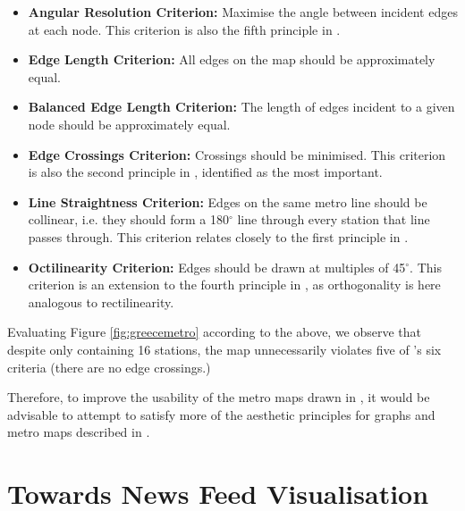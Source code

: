 \begin{itemize}
	\item \textbf{Angular Resolution Criterion:} Maximise the angle between incident edges at each node. This criterion is also the fifth principle in \citep{TheBasisForGraphDrawingAlgorithms}. 
	\item \textbf{Edge Length Criterion:} All edges on the map should be approximately equal.
	\item \textbf{Balanced Edge Length Criterion:} The length of edges incident to a given node should be approximately equal.
	\item \textbf{Edge Crossings Criterion:} Crossings should be minimised. This criterion is also the second principle in \citep{TheBasisForGraphDrawingAlgorithms}, identified as the most important.
	\item \textbf{Line Straightness Criterion:} Edges on the same metro line should be collinear, i.e. they should form a 180$^{\circ}$ line through every station that line passes through. This criterion relates closely to the first principle in \citep{TheBasisForGraphDrawingAlgorithms}.
	\item \textbf{Octilinearity Criterion:} Edges should be drawn at multiples of 45$^{\circ}$. This criterion is an extension to the fourth principle in \citep{TheBasisForGraphDrawingAlgorithms}, as orthogonality is here analogous to rectilinearity.
\end{itemize}

Evaluating Figure \ref{fig:greecemetro} according to the above, we observe that despite only containing 16 stations, the map unnecessarily violates five  of \citeauthor{AutomaticMetroMapLayout}'s six criteria (there are no edge crossings.)

Therefore, to improve the usability of the metro maps drawn in \citep{ConnectingTheDots, GeneratingInformationMaps, MetroMapsOfScience, InformationCartographyPre}, it would be advisable to attempt to satisfy more of the aesthetic principles for graphs and metro maps described in \citep{TheBasisForGraphDrawingAlgorithms, AutomaticMetroMapLayout}.


\section{Towards News Feed Visualisation}

